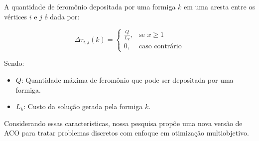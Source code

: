 A quantidade de feromônio depositada por uma formiga $k$ em uma aresta entre os vértices $i$ e $j$ é dada por:

\begin{equation}\Delta\tau_{i,j}(k) = \begin{cases} \frac{Q}{L_k},& \text{se } x\geq 1\\ 0,& \text{caso contrário} \end{cases}\end{equation}

Sendo:

\begin{itemize}  
	\item $Q$: Quantidade máxima de feromônio que pode ser depositada por uma formiga.
	\item $L_k$: Custo da solução gerada pela formiga  $k$.
\end{itemize}

Considerando essas características, nossa pesquisa propõe uma nova versão de ACO para tratar problemas discretos com enfoque em otimização multiobjetivo.
